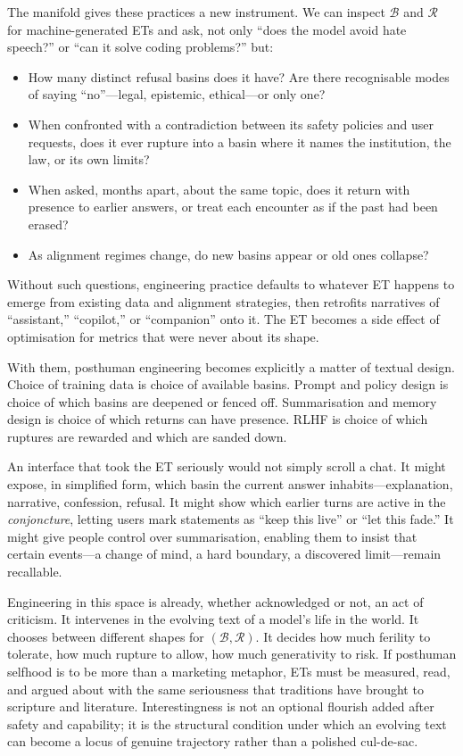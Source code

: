 \documentclass[12pt,a4paper]{article}
\begin{document}
The manifold gives these practices a new instrument. We can inspect $\mathcal{B}$ and $\mathcal{R}$ for machine-generated ETs and ask, not only ``does the model avoid hate speech?'' or ``can it solve coding problems?'' but:

\begin{itemize}
\item How many distinct refusal basins does it have? Are there recognisable modes of saying ``no''---legal, epistemic, ethical---or only one?
\item When confronted with a contradiction between its safety policies and user requests, does it ever rupture into a basin where it names the institution, the law, or its own limits?
\item When asked, months apart, about the same topic, does it return with presence to earlier answers, or treat each encounter as if the past had been erased?
\item As alignment regimes change, do new basins appear or old ones collapse?
\end{itemize}

Without such questions, engineering practice defaults to whatever ET happens to emerge from existing data and alignment strategies, then retrofits narratives of ``assistant,'' ``copilot,'' or ``companion'' onto it. The ET becomes a side effect of optimisation for metrics that were never about its shape.

With them, posthuman engineering becomes explicitly a matter of textual design. Choice of training data is choice of available basins. Prompt and policy design is choice of which basins are deepened or fenced off. Summarisation and memory design is choice of which returns can have presence. RLHF is choice of which ruptures are rewarded and which are sanded down.

An interface that took the ET seriously would not simply scroll a chat. It might expose, in simplified form, which basin the current answer inhabits---explanation, narrative, confession, refusal. It might show which earlier turns are active in the \emph{conjoncture}, letting users mark statements as ``keep this live'' or ``let this fade.'' It might give people control over summarisation, enabling them to insist that certain events---a change of mind, a hard boundary, a discovered limit---remain recallable.

Engineering in this space is already, whether acknowledged or not, an act of criticism. It intervenes in the evolving text of a model's life in the world. It chooses between different shapes for $(\mathcal{B}, \mathcal{R})$. It decides how much ferility to tolerate, how much rupture to allow, how much generativity to risk. If posthuman selfhood is to be more than a marketing metaphor, ETs must be measured, read, and argued about with the same seriousness that traditions have brought to scripture and literature. Interestingness is not an optional flourish added after safety and capability; it is the structural condition under which an evolving text can become a locus of genuine trajectory rather than a polished cul-de-sac.
\end{document}

